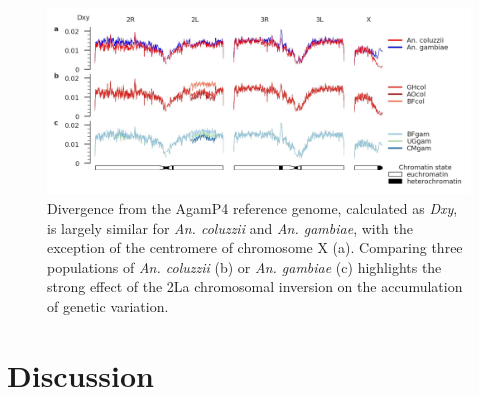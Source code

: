 \documentclass[a4paper,11pt,abstracton,hidelinks]{scrartcl}
\begin{document}
\begin{figure}[h]
	\begin{center}
		\includegraphics*[width=6.3in]{notebooks/refdiff/refdiff_phase2_combined.jpg}
	\end{center}
	\caption{Divergence from the AgamP4 reference genome, calculated as \textit{Dxy}, is largely similar for \textit{An. coluzzii} and \textit{An. gambiae}, with the exception of the centromere of chromosome X (a). Comparing three populations of \textit{An. coluzzii} (b) or \textit{An. gambiae} (c) highlights the strong effect of the 2La chromosomal inversion on the accumulation of genetic variation.}
	\label{refdiff}
\end{figure}


%


\section*{Discussion}
\end{document}

